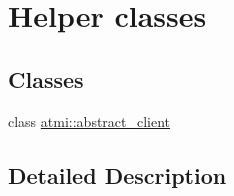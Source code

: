 \hypertarget{group__helpers}{\section{Helper classes}
\label{group__helpers}
}
\subsection*{Classes}
\begin{DoxyCompactItemize}
\item 
class \hyperlink{classatmi_1_1abstract__client}{atmi\+::abstract\+\_\+client}
\end{DoxyCompactItemize}


\subsection{Detailed Description}
